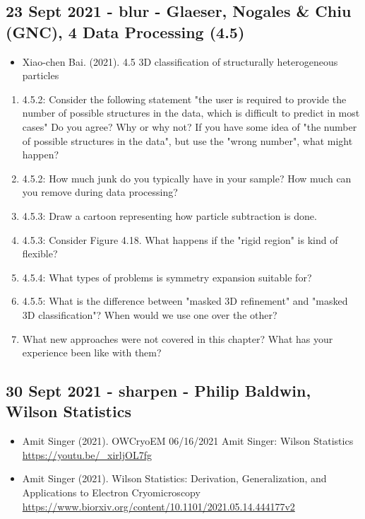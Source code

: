 \documentclass[11pt, oneside]{article}   	%
\begin{document}
\subsection{23 Sept 2021 - blur - Glaeser, Nogales \& Chiu (GNC), 4 Data Processing (4.5)}
\begin{itemize}
	\item Xiao-chen Bai. (2021). 4.5 3D classification of structurally heterogeneous particles
\end{itemize}
\begin{enumerate}
	\item 4.5.2: Consider the following statement "the user is required to provide the number of possible structures in the data, which is difficult to predict in most cases" Do you agree? Why or why not? If you have some idea of "the number of possible structures in the data", but use the "wrong number", what might happen?
	\item 4.5.2: How much junk do you typically have in your sample? How much can you remove during data processing?
	\item 4.5.3: Draw a cartoon representing how particle subtraction is done. 
	\item 4.5.3: Consider Figure 4.18. What happens if the "rigid region" is kind of flexible?
	\item 4.5.4: What types of problems is symmetry expansion suitable for?
	\item 4.5.5: What is the difference between "masked 3D refinement" and "masked 3D classification"? When would we use one over the other?
	\item What new approaches were not covered in this chapter? What has your experience been like with them?
\end{enumerate}

\subsection{30 Sept 2021 - sharpen - Philip Baldwin, Wilson Statistics}
\begin{itemize}
	\item Amit Singer (2021). OWCryoEM 06/16/2021 Amit Singer: Wilson Statistics \url{https://youtu.be/_xirljOL7fg}
	\item Amit Singer (2021). Wilson Statistics: Derivation, Generalization, and Applications to Electron Cryomicroscopy
 \url{https://www.biorxiv.org/content/10.1101/2021.05.14.444177v2}
\end{itemize}	
\end{document}
